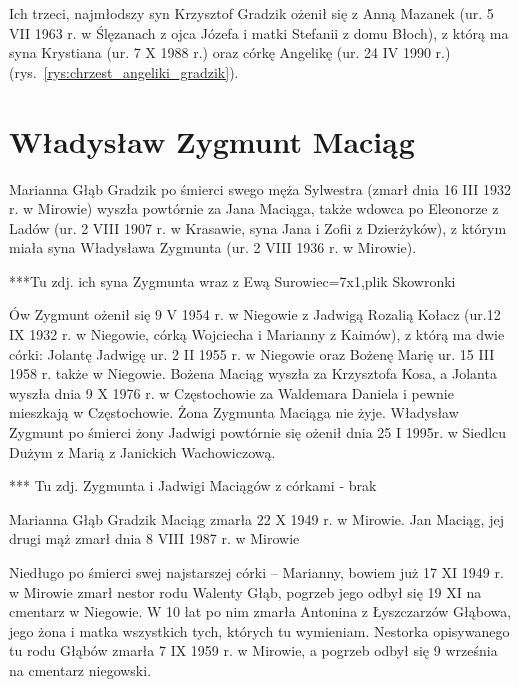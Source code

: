 Ich trzeci, najmłodszy syn Krzysztof Gradzik ożenił się z Anną Mazanek (ur. 5 VII 1963 r. w Ślęzanach z ojca Józefa i matki Stefanii z domu Błoch), z którą ma syna Krystiana (ur. 7 X 1988 r.) oraz córkę Angelikę (ur. 24 IV 1990 r.) (rys.~\ref{rys:chrzest_angeliki_gradzik}).




\section{Władysław Zygmunt Maciąg}
Marianna Głąb Gradzik po śmierci swego męża Sylwestra (zmarł dnia 16 III  1932 r. w Mirowie) wyszła powtórnie za Jana Maciąga, także wdowca po Eleonorze z Ladów (ur. 2 VIII 1907 r. w Krasawie, syna Jana i Zofii z Dzierżyków), z którym miała syna Władysława Zygmunta (ur. 2 VIII 1936 r. w Mirowie).

{\color{red}
***Tu zdj. ich syna Zygmunta wraz z Ewą Surowiec=7x1,plik Skowronki}


Ów Zygmunt ożenił się 9 V 1954 r. w Niegowie z Jadwigą Rozalią Kołacz (ur.12 IX 1932 r. w Niegowie, córką Wojciecha i Marianny z Kaimów), z którą ma dwie córki: Jolantę Jadwigę ur. 2 II 1955 r. w Niegowie oraz Bożenę Marię ur. 15 III 1958 r. także w Niegowie. Bożena Maciąg wyszła za Krzysztofa Kosa, a Jolanta wyszła dnia 9 X 1976 r. w Częstochowie za Waldemara Daniela i pewnie mieszkają w Częstochowie. Żona Zygmunta Maciąga nie żyje. Władysław Zygmunt po śmierci żony Jadwigi powtórnie się ożenił dnia 25 I 1995r. w Siedlcu Dużym z Marią z Janickich Wachowiczową.

{\color{red}
*** Tu zdj. Zygmunta i Jadwigi Maciągów z córkami - brak}

Marianna Głąb Gradzik Maciąg zmarła 22 X 1949 r. w Mirowie. Jan Maciąg, jej drugi mąż zmarł dnia 8 VIII 1987 r. w Mirowie

Niedługo po śmierci swej najstarszej córki -- Marianny, bowiem już 17 XI 1949 r. w Mirowie zmarł nestor rodu Walenty Głąb, pogrzeb jego odbył się 19 XI na cmentarz w Niegowie. W 10 lat po nim zmarła Antonina z Łyszczarzów Głąbowa, jego żona i matka wszystkich tych, których tu wymieniam. Nestorka opisywanego tu rodu Głąbów zmarła 7 IX 1959 r. w Mirowie, a pogrzeb odbył się 9 września na cmentarz niegowski.
